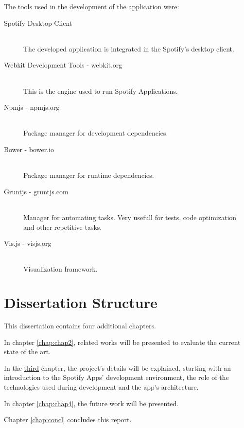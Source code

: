 The tools used in the development of the application were:

\begin{description}
  \item[Spotify Desktop Client] \hfill \\
    The developed application is integrated in the Spotify's desktop client.
  \item[Webkit Development Tools - webkit.org] \hfill \\
    This is the engine used to run Spotify Applications.
  \item[Npmjs - npmjs.org] \hfill \\
    Package manager for development dependencies.
  \item[Bower - bower.io] \hfill \\
    Package manager for runtime dependencies.
  \item[Gruntjs - gruntjs.com] \hfill \\
    Manager for automating tasks. Very usefull for tests, code optimization and other repetitive tasks.
  \item[Vis.js - visjs.org] \hfill \\
    Visualization framework.
\end{description}


\section{Dissertation Structure} \label{sec:struct}

This dissertation contains four additional chapters.

In chapter \ref{chap:chap2}, related works will be presented to evaluate the current state of the art.

In the \hyperref[chap:chap3]{third} chapter, the project's details will be explained, starting with an introduction to the Spotify Apps' development environment, the role of the technologies used during development and the app's architecture.

In chapter \ref{chap:chap4}, the future work will be presented.

Chapter \ref{chap:concl} concludes this report.

